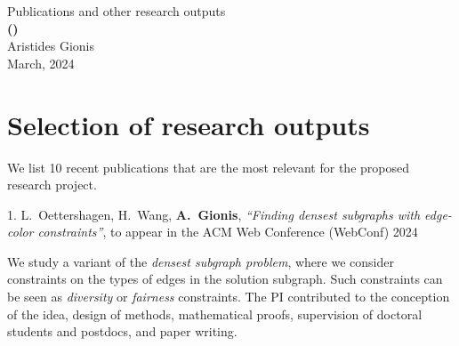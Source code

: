 \documentclass[a4paper,11pt]{article}
\begin{document}
\begin{center} 
{\Large Publications and other research outputs} \vspace{3mm}\\
{\Large\bf {\proposaltitle} {\sc (}{\acronymtitle}{\sc )}}  \vspace{3mm} \\
{\Large Aristides Gionis}  \vspace{2.5mm} \\
{\large March, 2024}
\end{center}

\section{Selection of research outputs}


We list 10 recent publications that are the most relevant for the proposed research project. 
\medskip

\biblistn


\item[{1.}]
{L.\ Oettershagen, H.\ Wang, \textbf{A.\ Gionis}},
{\em ``Finding densest subgraphs with edge-color constraints''},
to appear in the ACM Web Conference (WebConf) 2024
%
\item[]
We study a variant of the \emph{densest subgraph problem}, 
where we consider constraints on the types of edges in the solution subgraph.
Such constraints can be seen as \emph{diversity} or \emph{fairness} constraints. 
The PI contributed to the conception of the idea, 
design of methods, mathematical proofs, supervision of doctoral students and postdocs, and paper writing.
\end{document}
